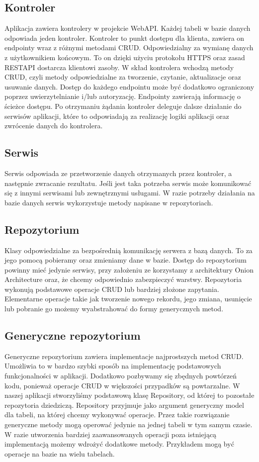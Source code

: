 \documentclass[a4paper,twoside,12pt]{book}
\begin{document}
\subsection{Kontroler}
Aplikacja zawiera kontrolery w projekcie WebAPI. Każdej tabeli w bazie danych odpowiada jeden kontroler. Kontroler to punkt dostępu dla klienta, zawiera on endpointy wraz z różnymi metodami CRUD. Odpowiedzialny za wymianę danych z użytkownikiem końcowym. To on dzięki użyciu protokołu HTTPS oraz zasad RESTAPI dostarcza klientowi zasoby. W skład kontrolera wchodzą metody CRUD, czyli metody odpowiedzialne za tworzenie, czytanie, aktualizacje oraz usuwanie danych. Dostęp do każdego endpointu może być dodatkowo ograniczony poprzez uwierzytelnianie i/lub autoryzację. Endpointy zawierają informację o ścieżce dostępu. Po otrzymaniu żądania kontroler deleguje dalsze działanie do serwisów aplikacji, które to odpowiadają za realizację logiki aplikacji oraz zwrócenie danych do kontrolera. 

\subsection{Serwis}
Serwis odpowiada ze przetworzenie danych otrzymanych przez kontroler, a następnie zwracanie rezultatu. Jeśli jest taka potrzeba serwis może komunikować się z innymi serwisami lub zewnętrznymi usługami. W razie potrzeby działania na bazie danych serwis wykorzystuje metody napisane w repozytoriach.  

\subsection{Repozytorium}
Klasy odpowiedzialne za bezpośrednią komunikację serwera z bazą danych. To za jego pomocą pobieramy oraz zmieniamy dane w bazie. Dostęp do repozytorium powinny mieć jedynie serwisy, przy założeniu ze korzystamy z architektury Onion Architecture oraz, że chcemy odpowiednio zabezpieczyć warstwy. Repozytoria wykonują podstawowe operacje CRUD lub bardziej złożone zapytania. Elementarne operacje takie jak tworzenie nowego rekordu, jego zmiana, usunięcie lub pobranie go możemy wyabstrahować do formy generycznych metod. 

\subsection{Generyczne repozytorium}
Generyczne repozytorium zawiera implementacje najprostszych metod CRUD. Umożliwia to w bardzo szybki sposób na implementację podstawowych funkcjonalności w aplikacji. Dodatkowo pozbywamy się zbędnych powtórzeń kodu, ponieważ operacje CRUD w większości przypadków są powtarzalne. W naszej aplikacji stworzyliśmy podstawową klasę Repository, od której to pozostałe repozytoria dziedziczą. Repository przyjmuje jako argument generyczny model dla tabeli, na której chcemy wykonywać operacje. Przez takie rozwiązanie generyczne metody mogą operować jedynie na jednej tabeli w tym samym czasie. W razie utworzenia bardziej zaawansowanych operacji poza istniejącą implementacją możemy wdrożyć dodatkowe metody. Przykładem mogą być operacje na bazie na wielu tabelach. 
\end{document}
